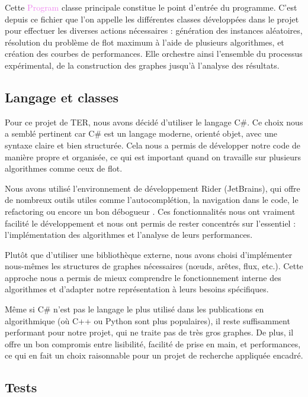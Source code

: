 \documentclass[a4paper]{article}
\begin{document}
Cette \textcolor{violet}{Program} classe principale constitue le point d'entrée du programme. C’est depuis ce fichier que l’on appelle les différentes classes développées dans le projet pour effectuer les diverses actions nécessaires : génération des instances aléatoires, résolution du problème de flot maximum à l’aide de plusieurs algorithmes, et création des courbes de performances. Elle orchestre ainsi l’ensemble du processus expérimental, de la construction des graphes jusqu’à l’analyse des résultats.

\subsection{Langage et classes}

Pour ce projet de TER, nous avons décidé d’utiliser le langage C\#. Ce choix nous a semblé pertinent car C\# est un langage moderne, orienté objet, avec une syntaxe claire et bien structurée. Cela nous a permis de développer notre code de manière propre et organisée, ce qui est important quand on travaille sur plusieurs algorithmes comme ceux de flot.

Nous avons utilisé l’environnement de développement Rider (JetBrains), qui offre de nombreux outils utiles comme l’autocomplétion, la navigation dans le code, le refactoring ou encore un bon débogueur \cite{jetbrains_rider}. Ces fonctionnalités nous ont vraiment facilité le développement et nous ont permis de rester concentrés sur l’essentiel : l’implémentation des algorithmes et l’analyse de leurs performances.

Plutôt que d’utiliser une bibliothèque externe, nous avons choisi d’implémenter nous-mêmes les structures de graphes nécessaires (nœuds, arêtes, flux, etc.). Cette approche nous a permis de mieux comprendre le fonctionnement interne des algorithmes et d’adapter notre représentation à leurs besoins spécifiques.

Même si C\# n’est pas le langage le plus utilisé dans les publications en algorithmique (où C++ ou Python sont plus populaires), il reste suffisamment performant pour notre projet, qui ne traite pas de très gros graphes. De plus, il offre un bon compromis entre lisibilité, facilité de prise en main, et performances, ce qui en fait un choix raisonnable pour un projet de recherche appliquée encadré.

\subsection{Tests}
\end{document}
